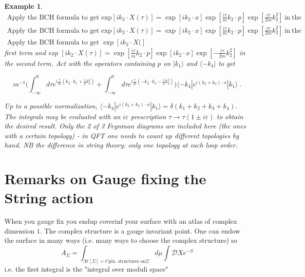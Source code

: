 \documentclass[10pt,
 article,
 amsmath,amssymb
]{revtex4-2}
\newtheorem{example}[theorem]{Example}
\begin{document}
\begin{example}
$\begin{array}{c}\text{Apply the BCH formula to get exp}\left[ik_2\cdot X(\tau)\right]=\exp\left[ik_2\cdot x\right]\exp\left[\frac{i\tau}mk_2\cdot p\right]\exp\left[\frac{i\tau}{2m}k_2^2\right]\mathrm{~in~the}\\\text{Apply the BCH formula to get exp}\left[ik_2\cdot X(\tau)\right]=\exp\left[ik_2\cdot x\right]\exp\left[\frac{i\tau}mk_2\cdot p\right]\exp\left[\frac{i\tau}{2m}k_2^2\right]\mathrm{\:in~the}\\\text{Apply the BCH formula to get }\exp\left[ik_2\cdot X(\right]\end{array}$ first term and exp $[ik_2\cdot X(\tau)]=\exp\left[\frac{i\tau}mk_2\cdot p\right]\exp\left[ik_2\cdot x\right]\exp\left[-\frac{i\tau}{2m}k_2^2\right]$ in the second term. Act with the operators containing $p$ on $|k_1\rangle$ and $\langle-k_4|$ to get

$$m^{-1}\Big(\int_{-\infty}^0d\tau e^{i\frac\tau m(k_2\cdot k_1+\frac12k_2^2)}+\int_{-\infty}^0d\tau e^{i\frac\tau m(-k_2\cdot k_4-\frac12k_2^2)}\Big)\langle-k_4|e^{i(k_2+k_3)\cdot x}|k_1\rangle\:.$$

Up to a possible normalization, $\langle-k_4|e^{i(k_2+k_3)\cdot x}|k_1\rangle=\delta(k_1+k_2+k_3+k_4).$ The integrals
may be evaluated with an $i\varepsilon$ prescription $\tau\to\tau(1\pm i\varepsilon)$ to obtain the desired result.
Only the 2 of 3 Feynman diagrams are included here (the ones with a certain topology) - in QFT one needs to count up different topologies by hand. NB the difference in string theory: only one topology at each loop order.




\end{example}



\section{Remarks on Gauge fixing the String action}
When you gauge fix you endup coverinf your surface with an atlas of complex dimension $1$. The complex structure is a gauge invariant 
point. One can endow the surface in many ways (i.e. many ways to choose the complex structure) so 
$$A_\Sigma =\int_{\mathcal{M}[\Sigma]=\text{Cplx. structures on}\Sigma} d\mu \int \mathcal{D} X e^{-S}$$
i.e. the first integral is the "integral over moduli space"
\end{document}
